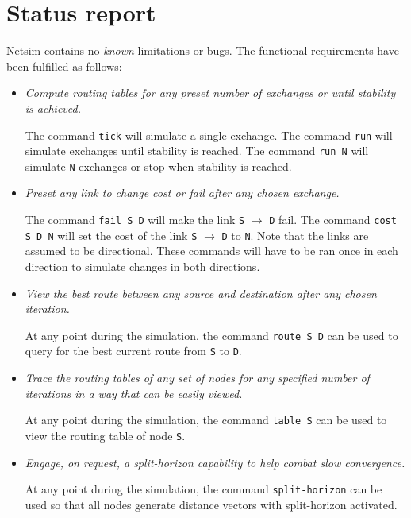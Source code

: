 \documentclass{scrartcl}
\begin{document}
\section{Status report}

Netsim contains no \textit{known} limitations or bugs. The functional
requirements have been fulfilled as follows:

\begin{itemize}
    \item \textit{Compute routing tables for any preset number of exchanges or
        until stability is achieved.}

        The command \texttt{tick} will simulate a single exchange. The command
        \texttt{run} will simulate exchanges until stability is reached. The
        command \texttt{run N} will simulate \texttt{N} exchanges or stop when
        stability is reached.

    \item \textit{Preset any link to change cost or fail after any chosen
        exchange.}

        The command \texttt{fail S D} will make the link \texttt{S}
        $\rightarrow$ \texttt{D} fail. The command \texttt{cost S D N} will set
        the cost of the link \texttt{S} $\rightarrow$ \texttt{D} to \texttt{N}.
        Note that the links are assumed to be directional. These commands will
        have to be ran once in each direction to simulate changes in both
        directions.
    
    \item \textit{View the best route between any source and destination after
        any chosen iteration.}

        At any point during the simulation, the command \texttt{route S D} can
        be used to query for the best current route from \texttt{S} to
        \texttt{D}.

    \item \textit{Trace the routing tables of any set of nodes for any specified
        number of iterations in a way that can be easily viewed.}

        At any point during the simulation, the command \texttt{table S} can be
        used to view the routing table of node \texttt{S}.

    \item \textit{Engage, on request, a split-horizon capability to help combat
        slow convergence.}

        At any point during the simulation, the command \texttt{split-horizon}
        can be used so that all nodes generate distance vectors with
        split-horizon activated.
\end{itemize}
\end{document}
